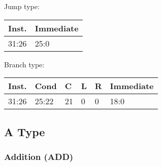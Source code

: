 \documentclass[12pt]{article}
\begin{document}
    \begin{center}
        Jump type:\\
        \vspace{1em}
        \begin{tabular}{ |p{1.8cm}|p{10.7cm}| }
            \hline
            \textbf{Inst.} & \textbf{Immediate}\\
            \hline
            31:26& 25:0\\
            \hline
        \end{tabular}
    \end{center}
    
    \begin{center}
        Branch type:\\
        \vspace{1em}
        \begin{tabular}{ |p{1.8cm}|p{1.5cm}|p{.3cm}|p{.3cm}|p{.3cm}|p{6.5cm}| }
            \hline
            \textbf{Inst.} & \textbf{Cond} &  \textbf{C} & \textbf{L}&\textbf{R}&\textbf{Immediate}\\
            \hline
            31:26& 25:22 & 21 & 0 & 0 &18:0\\
            \hline
        \end{tabular}
    \end{center}
    
\newpage
\subsection{A Type}



    
    \subsubsection{Addition (ADD)}
    
\end{document}

